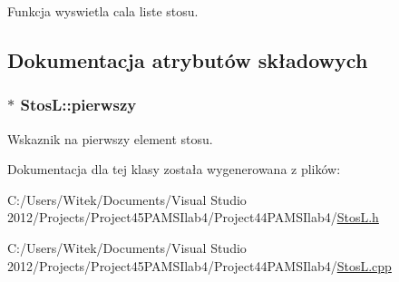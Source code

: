 Funkcja wyswietla cala liste stosu. 



\subsection{Dokumentacja atrybutów składowych}
\hypertarget{class_stos_l_a50de812f4b155571f88ea4ac6a0d5982}{
\subsubsection[{pierwszy}]{$\ast$ Stos\-L\-::pierwszy}}\label{class_stos_l_a50de812f4b155571f88ea4ac6a0d5982}


Wskaznik na pierwszy element stosu. 



Dokumentacja dla tej klasy została wygenerowana z plików\-:\begin{DoxyCompactItemize}
\item 
C\-:/\-Users/\-Witek/\-Documents/\-Visual Studio 2012/\-Projects/\-Project45\-P\-A\-M\-S\-Ilab4/\-Project44\-P\-A\-M\-S\-Ilab4/\hyperlink{_stos_l_8h}{Stos\-L.\-h}\item 
C\-:/\-Users/\-Witek/\-Documents/\-Visual Studio 2012/\-Projects/\-Project45\-P\-A\-M\-S\-Ilab4/\-Project44\-P\-A\-M\-S\-Ilab4/\hyperlink{_stos_l_8cpp}{Stos\-L.\-cpp}\end{DoxyCompactItemize}
